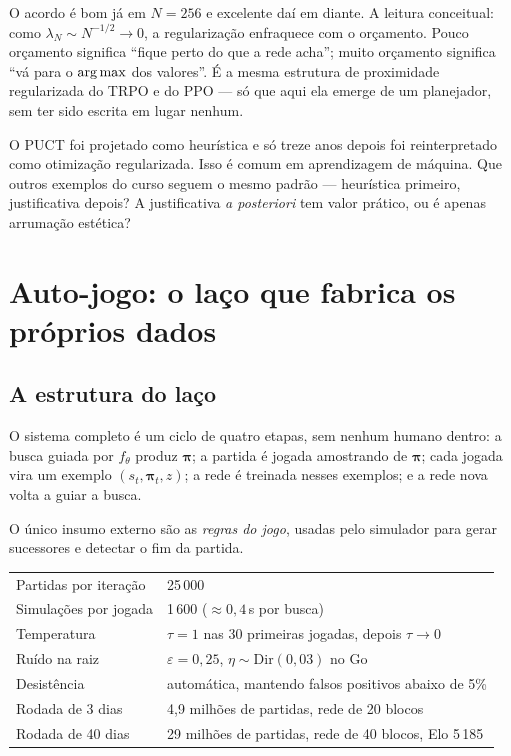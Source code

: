 \documentclass[11pt]{article}
\newcommand{\Nvis}{N}
\newcommand{\raizpol}{\bm{\pi}}
\begin{document}
O acordo é bom já em $\Nvis = 256$ e excelente daí em diante. A leitura conceitual:
como $\lambda_{\Nvis} \sim \Nvis^{-1/2} \to 0$, a regularização enfraquece com o
orçamento. Pouco orçamento significa ``fique perto do que a rede acha''; muito
orçamento significa ``vá para o $\operatorname*{arg\,max}$ dos valores''. É a mesma estrutura de
proximidade regularizada do TRPO e do PPO — só que aqui ela emerge de um
planejador, sem ter sido escrita em lugar nenhum.

\begin{discbox}
O PUCT foi projetado como heurística e só treze anos depois foi reinterpretado
como otimização regularizada. Isso é comum em aprendizagem de máquina. Que outros
exemplos do curso seguem o mesmo padrão — heurística primeiro, justificativa
depois? A justificativa \emph{a posteriori} tem valor prático, ou é apenas
arrumação estética?
\end{discbox}

\section{Auto-jogo: o laço que fabrica os próprios dados}

\subsection{A estrutura do laço}

O sistema completo é um ciclo de quatro etapas, sem nenhum humano dentro:
a busca guiada por $f_\theta$ produz $\raizpol$; a partida é jogada amostrando de
$\raizpol$; cada jogada vira um exemplo $(s_t, \raizpol_t, z)$; a rede é treinada
nesses exemplos; e a rede nova volta a guiar a busca.

O único insumo externo são as \emph{regras do jogo}, usadas pelo simulador para
gerar sucessores e detectar o fim da partida.

\begin{center}
\begin{tabular}{ll}
\toprule
Partidas por iteração & 25\,000 \\
Simulações por jogada & 1\,600 ($\approx 0{,}4$\,s por busca) \\
Temperatura & $\tau = 1$ nas 30 primeiras jogadas, depois $\tau \to 0$ \\
Ruído na raiz & $\varepsilon = 0{,}25$, $\eta \sim \mathrm{Dir}(0{,}03)$ no Go \\
Desistência & automática, mantendo falsos positivos abaixo de 5\% \\
Rodada de 3 dias & 4,9 milhões de partidas, rede de 20 blocos \\
Rodada de 40 dias & 29 milhões de partidas, rede de 40 blocos, Elo 5\,185 \\
\bottomrule
\end{tabular}
\end{center}
\end{document}
